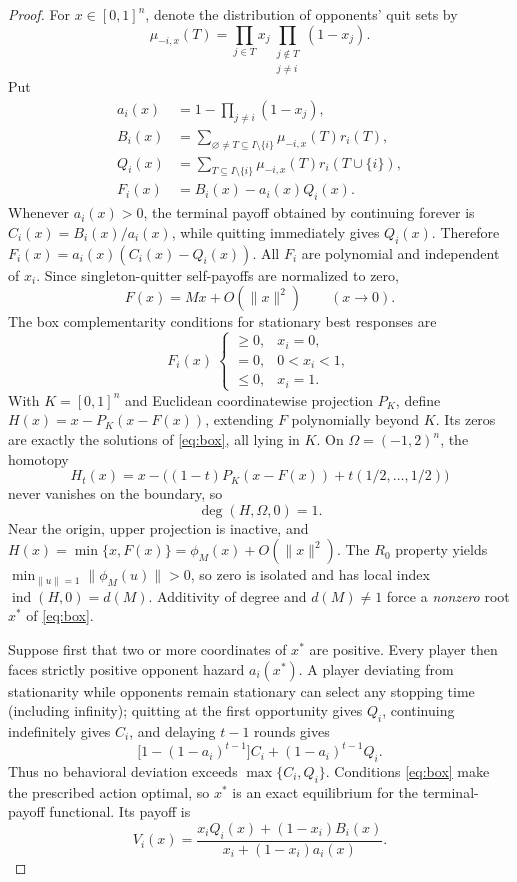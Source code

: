 \documentclass[11pt,a4paper]{article}
\theoremstyle{definition}
\theoremstyle{remark}
\newcommand{\ind}{\operatorname{ind}}
\begin{document}
\begin{proof}
For $x\in[0,1]^n$, denote the distribution of opponents' quit sets by
\[
\mu_{-i,x}(T)=\prod_{j\in T}x_j\prod_{\substack{j\notin T\\j\ne i}}(1-x_j).
\]
Put
\begin{align}
a_i(x)&=1-\prod_{j\ne i}(1-x_j),\label{eq:ai}\\
B_i(x)&=\sum_{\varnothing\ne T\subseteq I\setminus\{i\}}\mu_{-i,x}(T)r_i(T),\label{eq:Bi}\\
Q_i(x)&=\sum_{T\subseteq I\setminus\{i\}}\mu_{-i,x}(T)r_i(T\cup\{i\}),\label{eq:Qi}\\
F_i(x)&=B_i(x)-a_i(x)Q_i(x).\label{eq:Fi}
\end{align}
Whenever $a_i(x)>0$, the terminal payoff obtained by continuing forever is $C_i(x)=B_i(x)/a_i(x)$, while quitting immediately gives $Q_i(x)$. Therefore $F_i(x)=a_i(x)(C_i(x)-Q_i(x))$. All $F_i$ are polynomial and independent of $x_i$. Since singleton-quitter self-payoffs are normalized to zero,
\begin{equation}\label{eq:jac}
F(x)=Mx+O(\|x\|^2)\qquad (x\to0).
\end{equation}
The box complementarity conditions for stationary best responses are
\begin{equation}\label{eq:box}
F_i(x)\ \begin{cases}\ge0,&x_i=0,\\=0,&0<x_i<1,\\\le0,&x_i=1.\end{cases}
\end{equation}
With $K=[0,1]^n$ and Euclidean coordinatewise projection $P_K$, define $H(x)=x-P_K(x-F(x))$, extending $F$ polynomially beyond $K$. Its zeros are exactly the solutions of \eqref{eq:box}, all lying in $K$. On $\Omega=(-1,2)^n$, the homotopy
\[
H_t(x)=x-\big((1-t)P_K(x-F(x))+t(1/2,\dots,1/2)\big)
\]
never vanishes on the boundary, so
\begin{equation}\label{eq:globald}
\deg(H,\Omega,0)=1.
\end{equation}
Near the origin, upper projection is inactive, and $H(x)=\min\{x,F(x)\}=\phi_M(x)+O(\|x\|^2)$. The $R_0$ property yields $\min_{\|u\|=1}\|\phi_M(u)\|>0$, so zero is isolated and has local index $\ind(H,0)=d(M)$. Additivity of degree and $d(M)\ne1$ force a \emph{nonzero} root $x^*$ of \eqref{eq:box}.

Suppose first that two or more coordinates of $x^*$ are positive. Every player then faces strictly positive opponent hazard $a_i(x^*)$. A player deviating from stationarity while opponents remain stationary can select any stopping time (including infinity); quitting at the first opportunity gives $Q_i$, continuing indefinitely gives $C_i$, and delaying $t-1$ rounds gives
\[
\big[1-(1-a_i)^{t-1}\big]C_i+(1-a_i)^{t-1}Q_i.
\]
Thus no behavioral deviation exceeds $\max\{C_i,Q_i\}$. Conditions \eqref{eq:box} make the prescribed action optimal, so $x^*$ is an exact equilibrium for the terminal-payoff functional. Its payoff is
\begin{equation}\label{eq:stationaryV}
V_i(x)=\frac{x_iQ_i(x)+(1-x_i)B_i(x)}{x_i+(1-x_i)a_i(x)}.
\end{equation}


\end{proof}
\end{document}
